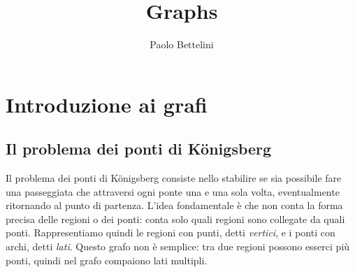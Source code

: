 \documentclass[a4paper]{article}
\title{Graphs}
\author{Paolo Bettelini}
\date{}
\begin{document}
\maketitle
\tableofcontents

\section{Introduzione ai grafi}

\subsection{Il problema dei ponti di Königsberg}

\begin{radioactive}
    Il problema dei ponti di Königsberg consiste nello stabilire se sia possibile fare una passeggiata che attraversi ogni ponte una e una sola volta, eventualmente ritornando al punto di partenza.
    L'idea fondamentale è che non conta la forma precisa delle regioni o dei ponti: conta solo quali regioni sono collegate da quali ponti. Rappresentiamo quindi le regioni con punti, detti \emph{vertici}, e i ponti con archi, detti \emph{lati}.
    Questo grafo non è semplice: tra due regioni possono esserci più ponti, quindi nel grafo compaiono lati multipli.
\end{radioactive}
\end{document}
